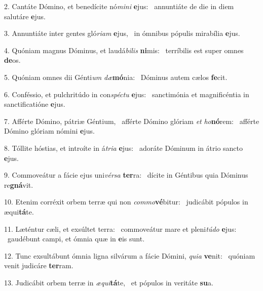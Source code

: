 2. Cantáte Dómino, et benedícite nó\textit{mi}\textit{ni} \textbf{e}jus: \ast\  annuntiáte de die in diem salutáre \textbf{e}jus.\

3. Annuntiáte inter gentes gló\textit{ri}\textit{am} \textbf{e}jus, \ast\  in ómnibus pópulis mirabília \textbf{e}jus.\

4. Quóniam magnus Dóminus, et laudá\textit{bi}\textit{lis} \textbf{ni}mis: \ast\  terríbilis est super omnes \textbf{de}os.\

5. Quóniam omnes dii Génti\textit{um} \textit{dæ}\textbf{mó}nia: \ast\  Dóminus autem cælos \textbf{fe}cit.\

6. Conféssio, et pulchritúdo in con\textit{spéc}\textit{tu} \textbf{e}jus: \ast\  sanctimónia et magnificéntia in sanctificatióne \textbf{e}jus.\

7. Afférte Dómino, pátriæ Géntium, \dag\  afférte Dómino glóriam \textit{et} \textit{ho}\textbf{nó}rem: \ast\  afférte Dómino glóriam nómini \textbf{e}jus.\

8. Tóllite hóstias, et introíte in á\textit{tri}\textit{a} \textbf{e}jus: \ast\  adoráte Dóminum in átrio sancto \textbf{e}jus.\

9. Commoveátur a fácie ejus uni\textit{vér}\textit{sa} \textbf{ter}ra: \ast\  dícite in Géntibus quia Dóminus re\textbf{gná}vit.\

10. Etenim corréxit orbem terræ qui non \textit{com}\textit{mo}\textbf{vé}bitur: \ast\  judicábit pópulos in æqui\textbf{tá}te.\

11. Læténtur cæli, et exsúltet terra: \dag\  commoveátur mare et pleni\textit{tú}\textit{do} \textbf{e}jus: \ast\  gaudébunt campi, et ómnia quæ in \textbf{e}is sunt.\

12. Tunc exsultábunt ómnia ligna silvárum a fácie Dómini, \textit{qui}\textit{a} \textbf{ve}nit: \ast\  quóniam venit judicáre \textbf{ter}ram.\

13. Judicábit orbem terræ in \textit{æ}\textit{qui}\textbf{tá}te, \ast\  et pópulos in veritáte \textbf{su}a.\

